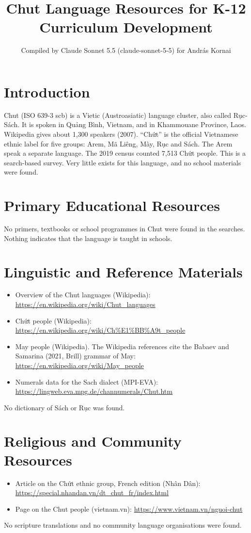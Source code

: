 \documentclass[12pt]{article}
\title{Chut Language Resources for K-12 Curriculum Development}
\author{Compiled by Claude Sonnet 5.5 (claude-sonnet-5-5) for Andr\'as Kornai}
\date{}
\begin{document}
\maketitle

\section{Introduction}
Chut (ISO 639-3 scb) is a Vietic (Austroasiatic) language cluster, also called Rục-Sách. It is spoken in Quảng Bình, Vietnam, and in Khammouane Province, Laos. Wikipedia gives about 1,300 speakers (2007). ``Chứt'' is the official Vietnamese ethnic label for five groups: Arem, Mã Liêng, Mày, Rục and Sách. The Arem speak a separate language. The 2019 census counted 7,513 Chứt people. This is a search-based survey. Very little exists for this language, and no school materials were found.

\section{Primary Educational Resources}
No primers, textbooks or school programmes in Chut were found in the searches. Nothing indicates that the language is taught in schools.

\section{Linguistic and Reference Materials}
\begin{itemize}
\item Overview of the Chut languages (Wikipedia): \url{https://en.wikipedia.org/wiki/Chut_languages}
\item Chứt people (Wikipedia): \url{https://en.wikipedia.org/wiki/Ch%E1%BB%A9t_people}
\item May people (Wikipedia). The Wikipedia references cite the Babaev and Samarina (2021, Brill) grammar of May: \url{https://en.wikipedia.org/wiki/May_people}
\item Numerals data for the Sach dialect (MPI-EVA): \url{https://lingweb.eva.mpg.de/channumerals/Chut.htm}
\end{itemize}
No dictionary of Sách or Rục was found.

\section{Religious and Community Resources}
\begin{itemize}
\item Article on the Chứt ethnic group, French edition (Nhân Dân): \url{https://special.nhandan.vn/dt_chut_fr/index.html}
\item Page on the Chut people (vietnam.vn): \url{https://www.vietnam.vn/nguoi-chut}
\end{itemize}
No scripture translations and no community language organisations were found.
\end{document}
